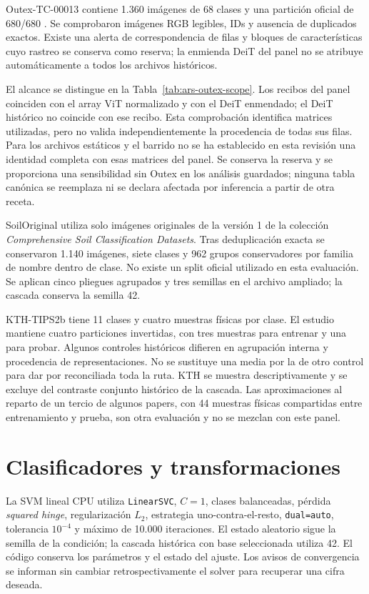 Outex-TC-00013 contiene 1.360 imágenes de 68 clases y una partición oficial de 680/680 \citep{ojala2002outex}. Se comprobaron imágenes RGB legibles, IDs y ausencia de duplicados exactos. Existe una alerta de correspondencia de filas y bloques de características cuyo rastreo se conserva como reserva; la enmienda DeiT del panel no se atribuye automáticamente a todos los archivos históricos.

El alcance se distingue en la Tabla~\ref{tab:ars-outex-scope}. Los recibos del panel coinciden con el array ViT normalizado y con el DeiT enmendado; el DeiT histórico no coincide con ese recibo. Esta comprobación identifica matrices utilizadas, pero no valida independientemente la procedencia de todas sus filas. Para los archivos estáticos y el barrido no se ha establecido en esta revisión una identidad completa con esas matrices del panel. Se conserva la reserva y se proporciona una sensibilidad sin Outex en los análisis guardados; ninguna tabla canónica se reemplaza ni se declara afectada por inferencia a partir de otra receta.


SoilOriginal utiliza solo imágenes originales de la versión 1 de la colección \emph{Comprehensive Soil Classification Datasets}. Tras deduplicación exacta se conservaron 1.140 imágenes, siete clases y 962 grupos conservadores por familia de nombre dentro de clase. No existe un split oficial utilizado en esta evaluación. Se aplican cinco pliegues agrupados y tres semillas en el archivo ampliado; la cascada conserva la semilla 42.

KTH-TIPS2b tiene 11 clases y cuatro muestras físicas por clase. El estudio mantiene cuatro particiones invertidas, con tres muestras para entrenar y una para probar. Algunos controles históricos difieren en agrupación interna y procedencia de representaciones. No se sustituye una media por la de otro control para dar por reconciliada toda la ruta. KTH se muestra descriptivamente y se excluye del contraste conjunto histórico de la cascada. Las aproximaciones al reparto de un tercio de algunos papers, con 44 muestras físicas compartidas entre entrenamiento y prueba, son otra evaluación y no se mezclan con este panel.

\section{Clasificadores y transformaciones}
La SVM lineal CPU utiliza \texttt{LinearSVC}, \(C=1\), clases balanceadas, pérdida \emph{squared hinge}, regularización \(L_2\), estrategia uno-contra-el-resto, \texttt{dual=auto}, tolerancia \(10^{-4}\) y máximo de 10.000 iteraciones. El estado aleatorio sigue la semilla de la condición; la cascada histórica con base seleccionada utiliza 42. El código conserva los parámetros y el estado del ajuste. Los avisos de convergencia se informan sin cambiar retrospectivamente el solver para recuperar una cifra deseada.

